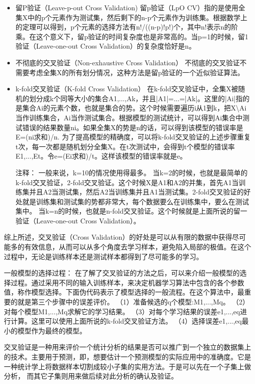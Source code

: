 \documentclass[10pt,a4paper]{ctexbook}
\begin{document}
\begin{itemize}
\item 留P验证（Leave-p-out Cross Validation)
留p验证（LpO CV）指的是使用全集X中的p个元素作为测试集，然后剩下的n-p个元素作为训练集。根据数学上的定理可以得到，p个元素的选择方法有n!/((n-p)!p!)个，其中n!表示n的阶乘。在这个意义下，留p验证的时间复杂度也是非常高的。当p=1的时候，留1验证（Leave-one-out Cross Validation）的复杂度恰好是n。

\item 不彻底的交叉验证（Non-exhaustive Cross Validation）
不彻底的交叉验证不需要考虑全集X的所有划分情况，这种方法是留p验证的一个近似验证算法。

\item k-fold交叉验证（K-fold Cross Validation）
在k-fold交叉验证中，全集X被随机的划分成k个同等大小的集合A1,...,Ak，并且|A1|=...=|Ak|。这里的|Ai|指的是集合Ai的元素个数，也就是集合的势。这个时候需要遍历i从1到k，把X\textbackslash{Ai}当作训练集合，Ai当作测试集合。根据模型的测试统计，可以得到Ai集合中测试错误的结果数量ni。如果全集X的势是n的话，可以得到该模型的错误率是E=(ni求和)/n.
为了提高模型的精确度，可以将k-fold交叉验证的上述步骤重复t次，每一次都是随机划分全集X。在t次测试中，会得到t个模型的错误率E1,...,Et。令e=(Ei求和)/t。这样该模型的错误率就是e。

注释：
一般来说，k=10的情况使用得最多。
当k=2的时候，也就是最简单的k-fold交叉验证，2-fold交叉验证。这个时候X是A1和A2的并集，首先A1当训练集并且A2当测试集，然后A2当训练集并且A1当测试集。2-fold交叉验证的好处就是训练集和测试集的势都非常大，每个数据要么在训练集中，要么在测试集中。
当k=n的时候，也就是n-fold交叉验证。这个时候就是上面所说的留一验证（Leave-one-out Cross Validation）。
\end{itemize}
综上所述，交叉验证（Cross Validation）的好处是可以从有限的数据中获得尽可能多的有效信息，从而可以从多个角度去学习样本，避免陷入局部的极值。在这个过程中，无论是训练样本还是测试样本都得到了尽可能多的学习。

一般模型的选择过程：
在了解了交叉验证的方法之后，可以来介绍一般模型的选择过程。通过采用不同的输入训练样本，来决定机器学习算法中包含的各个参数值，称作模型选择。下面伪代码表示了模型选择的一般流程。在这个算法中，最重要的就是第三个步骤中的误差评价。 
（1）准备候选的q个模型:M1,...,Mq。 
（2）对每个模型M1,...,Mq求解它的学习结果。 
（3）对每个学习结果的误差e1,...,eq进行计算。这里可以使用上面所说的k-fold交叉验证方法。 
（4）选择误差e1,...,eq最小的模型作为最终的模型。



交叉验证是一种用来评价一个统计分析的结果是否可以推广到一个独立的数据集上的技术。主要用于预测，即，想要估计一个预测模型的实际应用中的准确度。它是一种统计学上将数据样本切割成较小子集的实用方法。于是可以先在一个子集上做分析， 而其它子集则用来做后续对此分析的确认及验证。 
\end{document}
